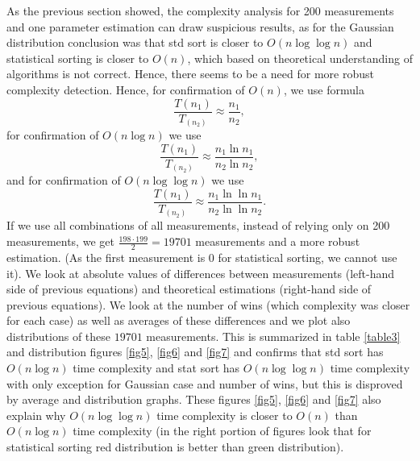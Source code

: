 \documentclass[12pt]{article}
\begin{document}
    As the previous section showed, the complexity analysis for 200 measurements and one parameter estimation can draw suspicious results, as for the Gaussian distribution conclusion was that std sort is closer to $O(n \log \log n)$ and statistical sorting is closer to $O(n)$, which based on theoretical understanding of algorithms is not correct. Hence, there seems to be a need for more robust complexity detection. Hence, for confirmation of $O(n)$, we use formula
    \[
    \frac{T(n_1)}{T_(n_2)} \approx \frac{n_1}{n_2},
    \]
    for confirmation of $O(n \log n)$ we use
    \[
    \frac{T(n_1)}{T_(n_2)} \approx \frac{n_1 \ln n_1}{n_2 \ln n_2},
    \]
    and for confirmation of $O(n \log \log n)$ we use
    \[
    \frac{T(n_1)}{T_(n_2)} \approx \frac{n_1 \ln \ln n_1}{n_2 \ln \ln n_2}.
    \]
    If we use all combinations of all measurements, instead of relying only on 200 measurements, we get $\frac{198 \cdot 199}{2} = 19701$ measurements and a more robust estimation. (As the first measurement is 0 for statistical sorting, we cannot use it). We look at absolute values of differences between measurements (left-hand side of previous equations) and theoretical estimations (right-hand side of previous equations). We look at the number of wins (which complexity was closer for each case) as well as averages of these differences and we plot also distributions of these $19701$ measurements. This is summarized in table \ref{table3} and distribution figures \ref{fig5}, \ref{fig6} and \ref{fig7} and confirms that std sort has $O(n \log n)$ time complexity and stat sort has $O(n \log \log n)$ time complexity with only exception for Gaussian case and number of wins, but this is disproved by average and distribution graphs. These figures \ref{fig5}, \ref{fig6} and \ref{fig7} also explain why $O(n \log \log n)$ time complexity is closer to $O(n)$ than $O(n \log n)$ time complexity (in the right portion of figures look that for statistical sorting red distribution is better than green distribution).
\end{document}
